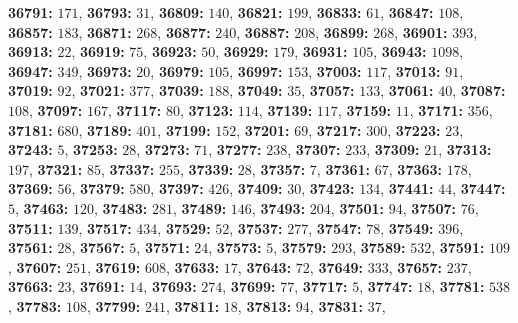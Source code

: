 \textsf{\bfseries 36791:} $171$, \textsf{\bfseries 36793:} $31$, \textsf{\bfseries 36809:} $140$, \textsf{\bfseries 36821:} $199$, \textsf{\bfseries 36833:} $61$, \textsf{\bfseries 36847:} $108$, \textsf{\bfseries 36857:} $183$, \textsf{\bfseries 36871:} $268$, \textsf{\bfseries 36877:} $240$, \textsf{\bfseries 36887:} $208$, \textsf{\bfseries 36899:} $268$, \textsf{\bfseries 36901:} $393$, \textsf{\bfseries 36913:} $22$, \textsf{\bfseries 36919:} $75$, \textsf{\bfseries 36923:} $50$, \textsf{\bfseries 36929:} $179$, \textsf{\bfseries 36931:} $105$, \textsf{\bfseries 36943:} $1098$, \textsf{\bfseries 36947:} $349$, \textsf{\bfseries 36973:} $20$, \textsf{\bfseries 36979:} $105$, \textsf{\bfseries 36997:} $153$, \textsf{\bfseries 37003:} $117$, \textsf{\bfseries 37013:} $91$, \textsf{\bfseries 37019:} $92$, \textsf{\bfseries 37021:} $377$, \textsf{\bfseries 37039:} $188$, \textsf{\bfseries 37049:} $35$, \textsf{\bfseries 37057:} $133$, \textsf{\bfseries 37061:} $40$, \textsf{\bfseries 37087:} $108$, \textsf{\bfseries 37097:} $167$, \textsf{\bfseries 37117:} $80$, \textsf{\bfseries 37123:} $114$, \textsf{\bfseries 37139:} $117$, \textsf{\bfseries 37159:} $11$, \textsf{\bfseries 37171:} $356$, \textsf{\bfseries 37181:} $680$, \textsf{\bfseries 37189:} $401$, \textsf{\bfseries 37199:} $152$, \textsf{\bfseries 37201:} $69$, \textsf{\bfseries 37217:} $300$, \textsf{\bfseries 37223:} $23$, \textsf{\bfseries 37243:} $5$, \textsf{\bfseries 37253:} $28$, \textsf{\bfseries 37273:} $71$, \textsf{\bfseries 37277:} $238$, \textsf{\bfseries 37307:} $233$, \textsf{\bfseries 37309:} $21$, \textsf{\bfseries 37313:} $197$, \textsf{\bfseries 37321:} $85$, \textsf{\bfseries 37337:} $255$, \textsf{\bfseries 37339:} $28$, \textsf{\bfseries 37357:} $7$, \textsf{\bfseries 37361:} $67$, \textsf{\bfseries 37363:} $178$, \textsf{\bfseries 37369:} $56$, \textsf{\bfseries 37379:} $580$, \textsf{\bfseries 37397:} $426$, \textsf{\bfseries 37409:} $30$, \textsf{\bfseries 37423:} $134$, \textsf{\bfseries 37441:} $44$, \textsf{\bfseries 37447:} $5$, \textsf{\bfseries 37463:} $120$, \textsf{\bfseries 37483:} $281$, \textsf{\bfseries 37489:} $146$, \textsf{\bfseries 37493:} $204$, \textsf{\bfseries 37501:} $94$, \textsf{\bfseries 37507:} $76$, \textsf{\bfseries 37511:} $139$, \textsf{\bfseries 37517:} $434$, \textsf{\bfseries 37529:} $52$, \textsf{\bfseries 37537:} $277$, \textsf{\bfseries 37547:} $78$, \textsf{\bfseries 37549:} $396$, \textsf{\bfseries 37561:} $28$, \textsf{\bfseries 37567:} $5$, \textsf{\bfseries 37571:} $24$, \textsf{\bfseries 37573:} $5$, \textsf{\bfseries 37579:} $293$, \textsf{\bfseries 37589:} $532$, \textsf{\bfseries 37591:} $109$, \textsf{\bfseries 37607:} $251$, \textsf{\bfseries 37619:} $608$, \textsf{\bfseries 37633:} $17$, \textsf{\bfseries 37643:} $72$, \textsf{\bfseries 37649:} $333$, \textsf{\bfseries 37657:} $237$, \textsf{\bfseries 37663:} $23$, \textsf{\bfseries 37691:} $14$, \textsf{\bfseries 37693:} $274$, \textsf{\bfseries 37699:} $77$, \textsf{\bfseries 37717:} $5$, \textsf{\bfseries 37747:} $18$, \textsf{\bfseries 37781:} $538$, \textsf{\bfseries 37783:} $108$, \textsf{\bfseries 37799:} $241$, \textsf{\bfseries 37811:} $18$, \textsf{\bfseries 37813:} $94$, \textsf{\bfseries 37831:} $37$, 
